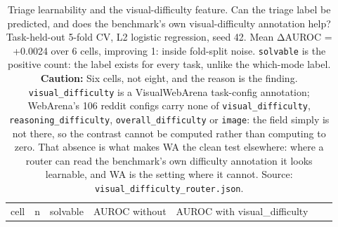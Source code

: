 \begin{table}[tp]
\centering
\caption{Triage learnability and the visual-difficulty feature. Can the triage label be predicted, and does the benchmark's own visual-difficulty annotation help? Task-held-out 5-fold CV, L2 logistic regression, seed 42. Mean ΔAUROC = +0.0024 over 6 cells, improving 1: inside fold-split noise. \texttt{solvable} is the positive count: the label exists for every task, unlike the which-mode label. \textbf{Caution:} Six cells, not eight, and the reason is the finding. \texttt{visual\_difficulty} is a VisualWebArena task-config annotation; WebArena's 106 reddit configs carry none of \texttt{visual\_difficulty}, \texttt{reasoning\_difficulty}, \texttt{overall\_difficulty} or \texttt{image}: the field simply is not there, so the contrast cannot be computed rather than computing to zero. That absence is what makes WA the clean test elsewhere: where a router can read the benchmark's own difficulty annotation it looks learnable, and WA is the setting where it cannot. Source: \texttt{visual\_difficulty\_router.json}.}
\label{tab:t22}
\footnotesize
\setlength{\tabcolsep}{3pt}
\begin{tabular}{@{}
  >{\raggedright\arraybackslash}p{}
  >{\raggedright\arraybackslash}p{}
  >{\raggedright\arraybackslash}p{}
  >{\raggedright\arraybackslash}p{}
  >{\raggedright\arraybackslash}p{}
  >{\raggedright\arraybackslash}p{}
  >{\raggedright\arraybackslash}p{}@{}}
\toprule
\begin{minipage}[b]{\linewidth}\raggedright
cell
\end{minipage} & \begin{minipage}[b]{\linewidth}\raggedright
n
\end{minipage} & \begin{minipage}[b]{\linewidth}\raggedright
solvable
\end{minipage} & \begin{minipage}[b]{\linewidth}\raggedright
AUROC without
\end{minipage} & \begin{minipage}[b]{\linewidth}\raggedright
AUROC with visual\_\allowbreak{}difficulty
\end{minipage} & \begin{minipage}[b]{\linewidth}\raggedright

\end{minipage}
\end{tabular}
\end{table}
